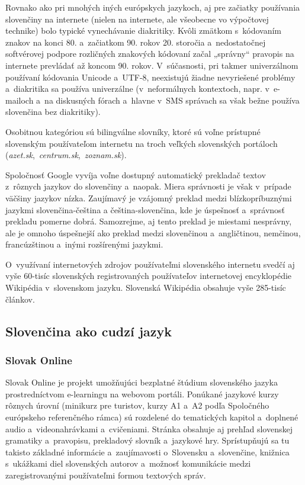 \begin{multicols}{2}
Rovnako ako pri mnohých iných európskych jazykoch, aj pre začiatky
používania slovenčiny na internete (nielen na internete, ale všeobecne vo výpočtovej technike) bolo typické vynechávanie diakritiky. Kvôli
zmätkom s~kódovaním znakov na konci 80. a~začiatkom 90. rokov 20.
storočia a~nedostatočnej softvérovej podpore rozličných znakových
kódovaní začal „správny“ pravopis na internete prevládať až
koncom 90. rokov. V~súčasnosti, pri takmer univerzálnom používaní
kódovania Unicode a~UTF-8, neexistujú žiadne nevyriešené problémy
a~diakritika sa používa univerzálne (v~neformálnych kontextoch,
napr. v~e-mailoch a~na diskusných fórach a~hlavne v~SMS správach
sa však bežne používa slovenčina bez diakritiky).

Osobitnou kategóriou sú bilingválne slovníky, ktoré sú voľne
prístupné slovenským používateľom internetu na troch veľkých
slovenských portáloch (\emph{azet.sk},~\emph{centrum.sk},~\emph{zoznam.sk}).

Spoločnosť Google vyvíja voľne dostupný automatický prekladač
textov z~rôznych jazykov do slovenčiny a~naopak. Miera správnosti je
však v~prípade väčšiny jazykov nízka. Zaujímavý je vzájomný
preklad medzi blízkopríbuznými jazykmi slovenčina-čeština a
čeština-slovenčina, kde je úspešnosť a~správnosť prekladu
pomerne dobrá. Samozrejme, aj tento preklad je miestami nesprávny, ale je
omnoho úspešnejší ako preklad medzi slovenčinou a~angličtinou,
nemčinou, francúzštinou a~inými rozšírenými jazykmi.

O~využívaní internetových zdrojov používateľmi slovenského
internetu svedčí aj vyše 60-tisíc slovenských registrovaných
používateľov internetovej encyklopédie Wikipédia v~slovenskom
jazyku. Slovenská Wikipédia obsahuje vyše 285-tisíc
článkov.

\subsection{Slovenčina ako cudzí jazyk}
\subsubsection{Slovak Online}
Slovak Online\cite{f6} je projekt umožňujúci bezplatné štúdium
slovenského jazyka prostredníctvom e-learningu na webovom portáli. Ponúkané jazykové
kurzy rôznych úrovní (minikurz pre turistov, kurzy A1 a~A2 podľa
Spoločného európskeho referenčného rámca) sú rozdelené do
tematických kapitol a~doplnené audio a~videonahrávkami a~cvičeniami.
Stránka obsahuje aj prehľad slovenskej gramatiky a~pravopisu,
prekladový slovník a~jazykové hry. Sprístupňujú sa tu takisto základné
informácie a~zaujímavosti o~Slovensku a~slovenčine, knižnica
s~ukážkami diel slovenských autorov a~možnosť komunikácie medzi
zaregistrovanými používateľmi formou textových správ.


\end{multicols}
